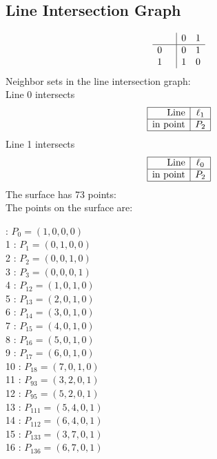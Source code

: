 \documentclass{article}
\begin{document}
{\subsection*{Line Intersection Graph}
{\arraycolsep=1pt
$$
\begin{array}{rr|*{2}r}
 &  & 0 & 1\\
\hline
0 &  & 0 & 1\\
1 &  & 1 & 0\\
\end{array}
$$
}%
Neighbor sets in the line intersection graph:\\
Line 0 intersects 
$$
\begin{array}{|r*{1}{|c}|}
\hline
\mbox{Line}  & \ell_{1}\\
\hline
\mbox{in point}  & P_{2}\\
\hline
\end{array}
$$
Line 1 intersects 
$$
\begin{array}{|r*{1}{|c}|}
\hline
\mbox{Line}  & \ell_{0}\\
\hline
\mbox{in point}  & P_{2}\\
\hline
\end{array}
$$
The surface has 73 points:\\
The points on the surface are:\\
\begin{multicols}{3}
 : $P_{0}=( 1, 0, 0, 0 )$\\
1 : $P_{1}=( 0, 1, 0, 0 )$\\
2 : $P_{2}=( 0, 0, 1, 0 )$\\
3 : $P_{3}=( 0, 0, 0, 1 )$\\
4 : $P_{12}=( 1, 0, 1, 0 )$\\
5 : $P_{13}=( 2, 0, 1, 0 )$\\
6 : $P_{14}=( 3, 0, 1, 0 )$\\
7 : $P_{15}=( 4, 0, 1, 0 )$\\
8 : $P_{16}=( 5, 0, 1, 0 )$\\
9 : $P_{17}=( 6, 0, 1, 0 )$\\
10 : $P_{18}=( 7, 0, 1, 0 )$\\
11 : $P_{93}=( 3, 2, 0, 1 )$\\
12 : $P_{95}=( 5, 2, 0, 1 )$\\
13 : $P_{111}=( 5, 4, 0, 1 )$\\
14 : $P_{112}=( 6, 4, 0, 1 )$\\
15 : $P_{133}=( 3, 7, 0, 1 )$\\
16 : $P_{136}=( 6, 7, 0, 1 )$\\

\end{multicols}}
\end{document}
